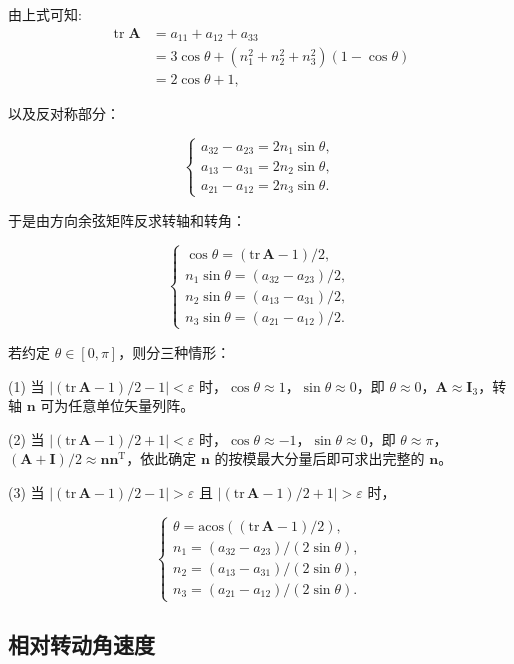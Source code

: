 由上式可知:$$\begin{aligned}
	\operatorname{tr} \boldsymbol{A} & =a_{11}+a_{12}+a_{33} \\
	& =3 \cos \theta+\left(n_{1}^{2}+n_{2}^{2}+n_{3}^{2}\right)(1-\cos \theta) \\
	& =2 \cos \theta+1,
\end{aligned}$$

以及反对称部分：

$$
\begin{cases}a_{32}-a_{23}=2n_1\sin\theta,\\a_{13}-a_{31}=2n_2\sin\theta,\\a_{21}-a_{12}=2n_3\sin\theta.\end{cases}
$$

于是由方向余弦矩阵反求转轴和转角：

$$
\begin{cases}\cos\theta=(\mathrm{tr}\,\boldsymbol{A}-1)/2,\\n_1\sin\theta=(a_{32}-a_{23})/2,\\n_2\sin\theta=(a_{13}-a_{31})/2,\\n_3\sin\theta=(a_{21}-a_{12})/2.\end{cases}
$$

若约定 $\theta\in[0,\pi]$，则分三种情形：

(1) 当 $|(\mathrm{tr}\,\boldsymbol{A}-1)/2-1|<\varepsilon$ 时，$\cos\theta\approx1$，$\sin\theta\approx0$，即 $\theta\approx0$，$\boldsymbol{A}\approx\boldsymbol{I}_3$，转轴 $\boldsymbol{n}$ 可为任意单位矢量列阵。

(2) 当 $|(\mathrm{tr}\,\boldsymbol{A}-1)/2+1|<\varepsilon$ 时，$\cos\theta\approx-1$，$\sin\theta\approx0$，即 $\theta\approx\pi$，$(\boldsymbol{A}+\boldsymbol{I})/2\approx\boldsymbol{n}\boldsymbol{n}^{\mathrm{T}}$，依此确定 $\boldsymbol{n}$ 的按模最大分量后即可求出完整的 $\boldsymbol{n}$。

(3) 当 $|(\mathrm{tr}\,\boldsymbol{A}-1)/2-1|>\varepsilon$ 且 $|(\mathrm{tr}\,\boldsymbol{A}-1)/2+1|>\varepsilon$ 时，

$$
\begin{cases}\theta=\mathrm{acos}\left((\mathrm{tr}\,\boldsymbol{A}-1)/2\right),\\n_1=(a_{32}-a_{23})/(2\sin\theta),\\n_2=(a_{13}-a_{31})/(2\sin\theta),\\n_3=(a_{21}-a_{12})/(2\sin\theta).\end{cases}
$$

\subsection{相对转动角速度}

